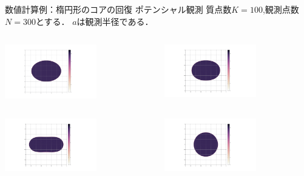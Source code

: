 \documentclass[dvipdfmx]{beamer}
\theoremstyle{remark}
\begin{document}
\begin{frame}{数値計算例：楕円形のコアの回復 ポテンシャル観測}
  質点数$K=100$,観測点数$N=300$とする．
  $a$は観測半径である．

  \begin{columns}
    \begin{column}{0.38\columnwidth}
      \setcounter{figure}{5}
      \centering
      \includegraphics[width=4cm]{fig/elliptic.png}
      \captionsetup[figure]{labelformat=empty,labelsep=none}
    \end{column}
    \hspace{-1cm}
    \begin{column}{0.38\columnwidth}
      \setcounter{figure}{9}
      \centering
      \includegraphics[width=4cm]{fig2/PN300K100R10E2.png}
      \captionsetup[figure]{labelformat=empty,labelsep=none}
    \end{column}
  \end{columns}

  \begin{columns}
    \begin{column}{0.38\columnwidth}
      \centering
      \includegraphics[width=4cm]{fig2/PN300K100R30E2.png}
      \captionsetup[figure]{labelformat=empty,labelsep=none}
    \end{column}
    \hspace{-1cm}
    \begin{column}{0.38\columnwidth}
      \centering
      \includegraphics[width=4cm]{fig2/PN300K100R100E2.png}
      \captionsetup[figure]{labelformat=empty,labelsep=none}
    \end{column}
  \end{columns}

\end{frame}
\end{document}
